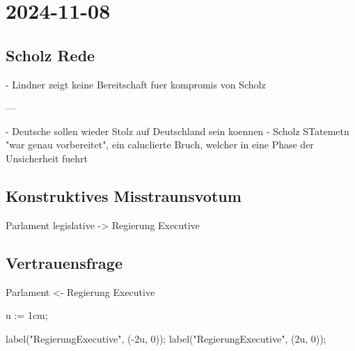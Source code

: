 \section{2024-11-08}

\subsection{Scholz Rede}

- Lindner zeigt keine Bereitschaft fuer kompromis von Scholz


---

- Deutsche sollen wieder Stolz auf Deutschland sein koennen
- Scholz STatemetn "war genau vorbereitet", ein caluclierte Bruch, welcher in eine Phase der Unsicherheit fuehrt

\subsection{Konstruktives Misstraunsvotum}

Parlament legislative -> Regierung Executive

\subsection{Vertrauensfrage}

Parlament <- Regierung Executive

\startMPpage

u := 1cm;

label("Regierung\crlf Executive", (-2u, 0));
label("Regierung\crlf Executive", (2u, 0));
\stopMPpage
\stopbuffer
{}
